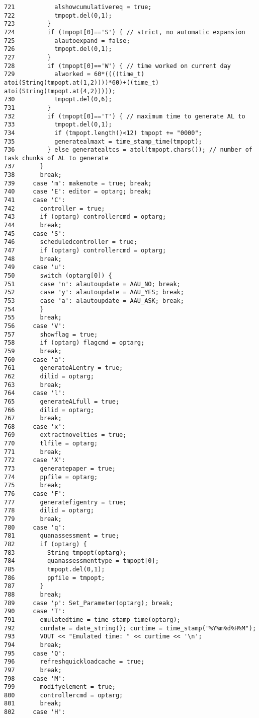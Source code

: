 \begin{verbatim}
721           alshowcumulativereq = true;
722           tmpopt.del(0,1);
723         }
724         if (tmpopt[0]=='S') { // strict, no automatic expansion
725           alautoexpand = false;
726           tmpopt.del(0,1);
727         }
728         if (tmpopt[0]=='W') { // time worked on current day
729           alworked = 60*((((time_t) atoi(String(tmpopt.at(1,2))))*60)+((time_t) atoi(String(tmpopt.at(4,2)))));
730           tmpopt.del(0,6);
731         }
732         if (tmpopt[0]=='T') { // maximum time to generate AL to
733           tmpopt.del(0,1);
734           if (tmpopt.length()<12) tmpopt += "0000";
735           generatealmaxt = time_stamp_time(tmpopt);
736         } else generatealtcs = atol(tmpopt.chars()); // number of task chunks of AL to generate
737       }
738       break;
739     case 'm': makenote = true; break;
740     case 'E': editor = optarg; break;
741     case 'C':
742       controller = true;
743       if (optarg) controllercmd = optarg;
744       break;
745     case 'S':
746       scheduledcontroller = true;
747       if (optarg) controllercmd = optarg;
748       break;
749     case 'u':
750       switch (optarg[0]) {
751       case 'n': alautoupdate = AAU_NO; break;
752       case 'y': alautoupdate = AAU_YES; break;
753       case 'a': alautoupdate = AAU_ASK; break;
754       }
755       break;
756     case 'V':
757       showflag = true;
758       if (optarg) flagcmd = optarg;
759       break;
760     case 'a':
761       generateALentry = true;
762       dilid = optarg;
763       break;
764     case 'l':
765       generateALfull = true;
766       dilid = optarg;
767       break;
768     case 'x':
769       extractnovelties = true;
770       tlfile = optarg;
771       break;
772     case 'X':
773       generatepaper = true;
774       ppfile = optarg;
775       break;
776     case 'F':
777       generatefigentry = true;
778       dilid = optarg;
779       break;
780     case 'q':
781       quanassessment = true;
782       if (optarg) {
783         String tmpopt(optarg);
784         quanassessmenttype = tmpopt[0];
785         tmpopt.del(0,1);
786         ppfile = tmpopt;
787       }
788       break;
789     case 'p': Set_Parameter(optarg); break;
790     case 'T':
791       emulatedtime = time_stamp_time(optarg);
792       curdate = date_string(); curtime = time_stamp("%Y%m%d%H%M");
793       VOUT << "Emulated time: " << curtime << '\n';
794       break;
795     case 'Q':
796       refreshquickloadcache = true;
797       break;
798     case 'M':
799       modifyelement = true;
800       controllercmd = optarg;
801       break;
802     case 'H':

\end{verbatim}
